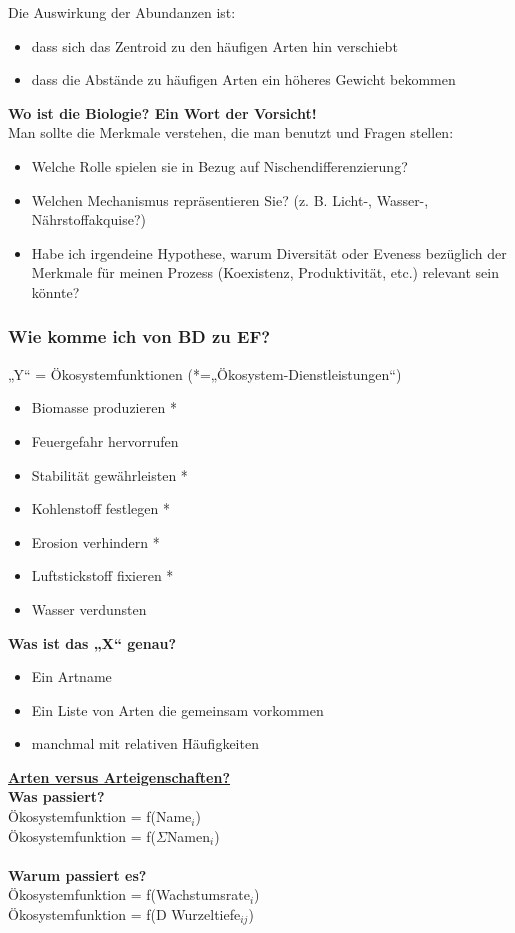 Die Auswirkung der Abundanzen ist:
\begin{itemize}
	\item dass sich das Zentroid zu den häufigen Arten hin verschiebt
	\item dass die Abstände zu häufigen Arten ein höheres Gewicht bekommen
\end{itemize}

\newpage
\textbf{Wo ist die Biologie? Ein Wort der Vorsicht!}\\
Man sollte die Merkmale verstehen, die man benutzt und Fragen stellen:
\begin{itemize}
	\item Welche Rolle spielen sie in Bezug auf Nischendifferenzierung?
	\item Welchen Mechanismus repräsentieren Sie? (z. B. Licht-, Wasser-, Nährstoffakquise?)
	\item Habe ich irgendeine Hypothese, warum Diversität oder Eveness bezüglich der Merkmale für meinen Prozess (Koexistenz, Produktivität, etc.) relevant sein könnte?
\end{itemize}

\subsubsection{Wie komme ich von BD zu EF?}
„Y“ = Ökosystemfunktionen (*=„Ökosystem-Dienstleistungen“)
\begin{itemize}
	\item Biomasse produzieren *
	\item Feuergefahr hervorrufen
	\item Stabilität gewährleisten *
	\item Kohlenstoff festlegen *
	\item Erosion verhindern *
	\item Luftstickstoff fixieren *
	\item Wasser verdunsten
\end{itemize}

\textbf{Was ist das „X“ genau?}\\
\begin{itemize}
	\item Ein Artname
	\item Ein Liste von Arten die gemeinsam vorkommen
	\item manchmal mit relativen Häufigkeiten
\end{itemize}

\underline{\textbf{Arten versus Arteigenschaften?}}\\
\textbf{Was passiert?}\\
Ökosystemfunktion = f(Name$_i$)\\
Ökosystemfunktion = f($\Sigma$Namen$_i$)
\\\\
\textbf{Warum passiert es?}\\
Ökosystemfunktion = f(Wachstumsrate$_i$)\\
Ökosystemfunktion = f(D Wurzeltiefe$_{ij}$)\\

